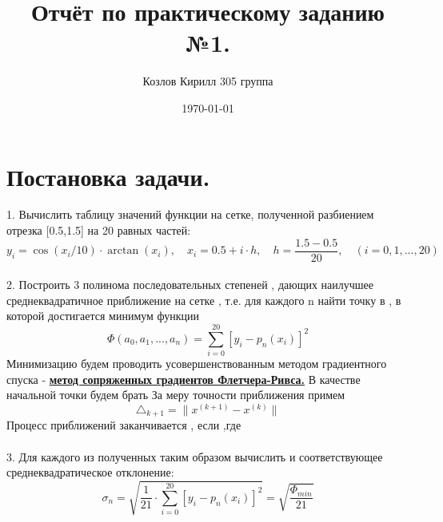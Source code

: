 \documentclass{article}
\title{Отчёт по практическому заданию №1.}
\author{Козлов Кирилл 305 группа}
\date{\today}
\begin{document}
\maketitle

\newpage

\tableofcontents


\newpage

\section{Постановка задачи.}
\text{$\quad$}1. Вычислить таблицу значений функции   на сетке, полученной разбиением отрезка [0.5,1.5] на 20 равных частей:
\[ \text{$y_i = \cos(x_i/10)\cdot\arctan(x_i),\quad x_i = 0.5 + i{\cdot}h, \quad h = \frac{1.5-0.5}{20} ,\quad (i = 0,1,...,20) $}\]\\
\text{$\quad$}2. Построить 3 полинома  последовательных степеней , дающих наилучшее 
среднеквадратичное приближение  на сетке  , т.е. для каждого n найти точку  в , в которой
достигается минимум функции \[ \Phi(a_{0},a_{1}, ... ,a_{n}) = \sum_{i=0}^{20}[y_i - p_{n}(x_{i})]^2\] 
Минимизацию  будем проводить усовершенствованным методом градиентного спуска 
- \textbf{\underline{метод сопряженных градиентов Флетчера-Ривса.}} 
В качестве начальной точки будем брать  
За меру точности приближения примем \[\triangle_{k+1} = \lVert x^{(k+1)}-x^{(k)}\rVert\] 
Процесс приближений заканчивается , если  ,где  \\\\
\text{$\quad$}3. Для каждого из полученных таким образом  вычислить  
и соответствующее среднеквадратическое отклонение:\[ \sigma_{n} = \sqrt{\frac{1}{21}\cdot\sum_{i=0}^{20}[y_i - p_{n}(x_{i})]^2} = \sqrt{\frac{\Phi_{min}}{21}}\]
\end{document}

